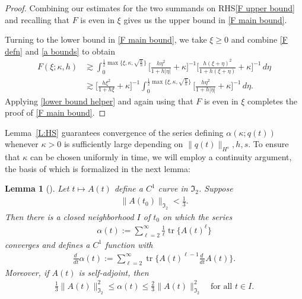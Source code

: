 \documentclass{amsart}
\DeclareMathOperator{\tr}{tr}
\newtheorem{lemma}[theorem]{Lemma}
\theoremstyle{definition}
\theoremstyle{remark}
\begin{document}
\begin{proof}
Combining our estimates for the two summands on RHS\eqref{F upper bound} and recalling that \(F\) is even in \(\xi\) gives us the upper bound in \eqref{F main bound}.

Turning to the lower bound in \eqref{F main bound}, we take \(\xi\geq 0\) and combine \eqref{F defn} and \eqref{a bounds} to obtain
\begin{align*}
F(\xi;\kappa,h) &\gtrsim \int_0^{\frac12\max\{\xi,\kappa,\sqrt{\frac\kappa h}\}} \bigl[\tfrac{h\eta^2}{1+h|\eta|} +\kappa\bigr]^{-1}\bigl[\tfrac{h(\xi+\eta)^2}{1+h(\xi+\eta)} + \kappa\bigr]^{-1} \,d\eta\\
&\gtrsim \bigl[\tfrac{h\xi^2}{1+h\xi} + \kappa\bigr]^{-1}\int_0^{\frac12\max\{\xi,\kappa,\sqrt{\frac\kappa h}\}} \bigl[\tfrac{h\eta^2}{1+h|\eta|} +\kappa\bigr]^{-1} \,d\eta.
\end{align*}
Applying \eqref{lower bound helper} and again using that \(F\) is even in \(\xi\) completes the proof of \eqref{F main bound}. 
\end{proof}

Lemma~\ref{L:HS} guarantees convergence of the series defining $\alpha(\kappa;q(t))$ whenever $\kappa>0$ is sufficiently large depending on \(\|q(t)\|
_{H^s},h,s\).  To ensure that \(\kappa\) can be chosen uniformly in time, we will employ a continuity argument, the basis of which is formalized in the next lemma: 

\begin{lemma}[{\cite[Lemma 1.5]{KVZ}}] \label{L:C1}
Let $t\mapsto A(t)$ define a $C^1$ curve in $\mathfrak{I}_2$.  Suppose
\begin{align*}
\bigl\| A(t_0) \bigr\|_{\mathfrak I_2} < \tfrac13.
\end{align*}
Then there is a closed neighborhood $I$ of $t_0$ on which the series
\begin{align*}
\alpha(t) := \sum_{\ell=2}^\infty \tfrac{1}{\ell} \tr\bigl\{ A(t)^\ell \bigr\}
\end{align*}
converges and defines a $C^1$ function with
 \begin{align*}
\tfrac{d\ }{dt} \alpha(t) := \sum_{\ell=2}^\infty  \tr\bigl\{ A(t)^{\ell-1} \tfrac{d\ }{dt} A(t) \bigr\}.
\end{align*}
Moreover, if $A(t)$ is self-adjoint, then
\begin{align*}
\tfrac13 \| A(t) \|^2_{\mathfrak I_2} \leq \alpha(t) \leq \tfrac23 \| A(t) \|^2_{\mathfrak I_2} \quad\text{for all $t\in I$.}
\end{align*}
\end{lemma}
\end{document}
